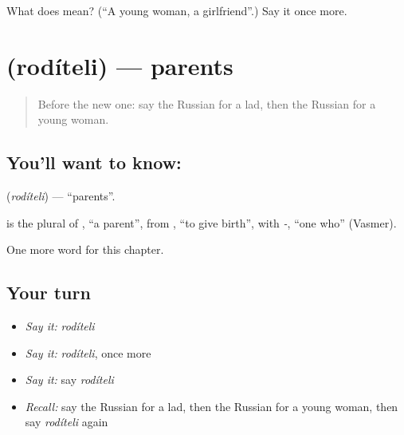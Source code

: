 \begin{tcolorbox}[breakable,colback=teal!4,colframe=teal!35!black,title={Before you move on}]
What does  mean? (\textquotedblleft{}A young woman, a girlfriend\textquotedblright{}.) Say it once more.
\end{tcolorbox}
\section[\texorpdfstring{\ru{родители} (rodíteli)}{родители (rodíteli)}]{ (rodíteli) — parents}

\label{lesson:RU-C254-roditeli}



\begin{quote}
Before the new one: say the Russian for a lad, then the Russian for a young woman.
\end{quote}

\subsection*{You'll want to know: }
\textbf{} (\emph{rodíteli}) — \textquotedblleft{}parents\textquotedblright{}.

\begin{cousinweb}
\textbf{} is the plural of \emph{}, \textquotedblleft{}a parent\textquotedblright{}, from \emph{}, \textquotedblleft{}to give birth\textquotedblright{}, with \emph{-}, \textquotedblleft{}one who\textquotedblright{} (Vasmer).
\end{cousinweb}

\begin{grammarlens}[title={What you've built}]
One more word for this chapter.
\end{grammarlens}

\subsection*{Your turn}
\begin{itemize}
\raggedright
  \item \emph{Say it:} \emph{rodíteli}
  \item \emph{Say it:} \emph{rodíteli}, once more
  \item \emph{Say it:} say \emph{rodíteli}
  \item \emph{Recall:} say the Russian for a lad, then the Russian for a young woman, then say \emph{rodíteli} again
\end{itemize}

